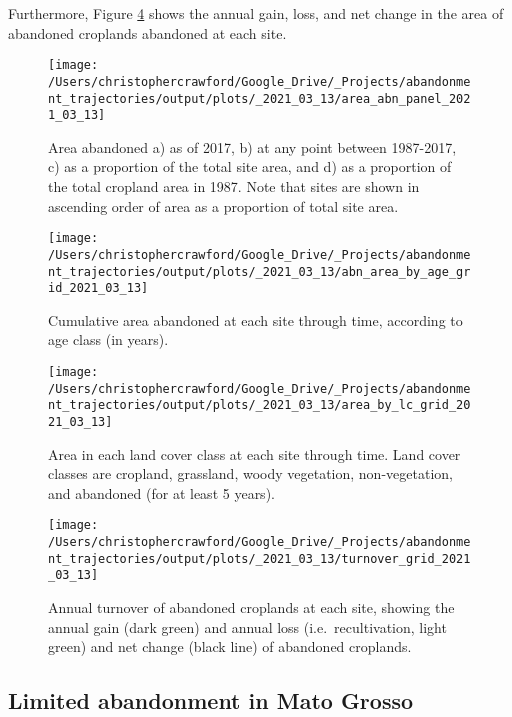 \documentclass[9pt,twoside,lineno]{pnas-new}
\begin{document}
Furthermore, Figure \ref{fig:turnover-grid} shows the annual gain, loss, and net change in the area of abandoned croplands abandoned at each site.



\begin{figure}
\texttt{[image: /Users/christophercrawford/Google\_Drive/\_Projects/abandonment\_trajectories/output/plots/\_2021\_03\_13/area\_abn\_panel\_2021\_03\_13]} \caption{Area abandoned a) as of 2017, b) at any point between 1987-2017, c) as a proportion of the total site area, and d) as a proportion of the total cropland area in 1987. Note that sites are shown in ascending order of area as a proportion of total site area.}\label{fig:area-abn-panel}
\end{figure}



\begin{figure}
\texttt{[image: /Users/christophercrawford/Google\_Drive/\_Projects/abandonment\_trajectories/output/plots/\_2021\_03\_13/abn\_area\_by\_age\_grid\_2021\_03\_13]} \caption{Cumulative area abandoned at each site through time, according to age class (in years).}\label{fig:area-abn-by-age-class}
\end{figure}



\begin{figure}
\texttt{[image: /Users/christophercrawford/Google\_Drive/\_Projects/abandonment\_trajectories/output/plots/\_2021\_03\_13/area\_by\_lc\_grid\_2021\_03\_13]} \caption{Area in each land cover class at each site through time. Land cover classes are cropland, grassland, woody vegetation, non-vegetation, and abandoned (for at least 5 years).}\label{fig:area-by-lc}
\end{figure}



\begin{figure}
\texttt{[image: /Users/christophercrawford/Google\_Drive/\_Projects/abandonment\_trajectories/output/plots/\_2021\_03\_13/turnover\_grid\_2021\_03\_13]} \caption{Annual turnover of abandoned croplands at each site, showing the annual gain (dark green) and annual loss (i.e.~recultivation, light green) and net change (black line) of abandoned croplands.}\label{fig:turnover-grid}
\end{figure}

\hypertarget{mato-grosso}{%
\subsection{Limited abandonment in Mato Grosso}\label{mato-grosso}}
\end{document}
